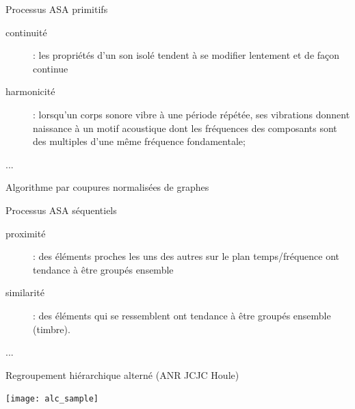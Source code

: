 
\begin{frame}{Processus ASA \og primitifs \fg}
\begin{description}
\item[\alert{continuité}] : les propriétés d'un son isolé tendent à se modifier lentement et de façon continue
\item[\alert{harmonicité}] : lorsqu'un corps sonore vibre à une période répétée, ses vibrations donnent naissance à un motif acoustique dont les fréquences des composants sont des multiples d'une même fréquence fondamentale;
\item[...]
\end{description}
\end{frame}
 
\begin{frame}{Algorithme par coupures normalisées de graphes}
\begin{center}
\end{center}
\end{frame}



\begin{frame}{Processus ASA \og séquentiels \fg}
\begin{description}
\item[proximité] : des éléments proches les uns des autres sur le plan temps/fréquence ont tendance à être groupés ensemble
\item[similarité] : des éléments qui se ressemblent ont tendance à être groupés ensemble (timbre). 
\item[...]
\end{description}
\end{frame}

\begin{frame}{Regroupement hiérarchique alterné (ANR JCJC Houle)}
\begin{center}
   \texttt{[image: alc\_sample]}  
\end{center}
\end{frame}

